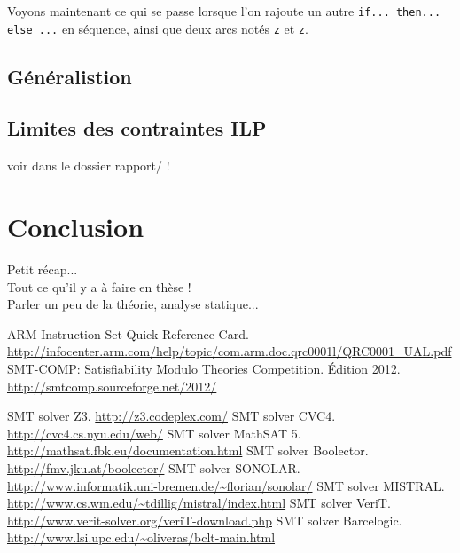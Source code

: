 \documentclass[french]{article}
\begin{document}
  Voyons maintenant ce qui se passe lorsque l'on rajoute un autre \texttt{if... then... else ...} en séquence, ainsi que deux arcs notés \texttt{z} et \texttt{\textlnot z}.
  
  
  \subsection{Généralistion}
  
  \subsection{Limites des contraintes ILP}
  voir dans le dossier rapport/ !
  
  \pagebreak
  \section*{Conclusion}
  Petit récap...\\
  Tout ce qu'il y a à faire en thèse !\\
  Parler un peu de la théorie, analyse statique...\\

\newpage{}
%
\begin{thebibliography}{1}
     ARM Instruction Set Quick Reference Card. \url{http://infocenter.arm.com/help/topic/com.arm.doc.qrc0001l/QRC0001_UAL.pdf}
     SMT-COMP: Satisfiability Modulo Theories Competition. Édition 2012. \url{http://smtcomp.sourceforge.net/2012/}
    
     SMT solver Z3. \url{http://z3.codeplex.com/}
     SMT solver CVC4. \url{http://cvc4.cs.nyu.edu/web/}
     SMT solver MathSAT 5. \url{http://mathsat.fbk.eu/documentation.html}
     SMT solver Boolector. \url{http://fmv.jku.at/boolector/}
     SMT solver SONOLAR. \url{http://www.informatik.uni-bremen.de/~florian/sonolar/}
     SMT solver MISTRAL. \url{http://www.cs.wm.edu/~tdillig/mistral/index.html}
     SMT solver VeriT. \url{http://www.verit-solver.org/veriT-download.php}
     SMT solver Barcelogic. \url{http://www.lsi.upc.edu/~oliveras/bclt-main.html}
\end{thebibliography}
\end{document}
